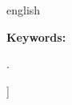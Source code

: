 \begin{@twocolumnfalse}
\begin{otherlanguage*}{english}
		{\fontsize{11}{13}\selectfont
		\AbstractArtigo
		\par}
		\vspace{0.7\baselineskip} \fontsize{11}{12}\selectfont
		\textbf{Keywords: }{\fontsize{11}{12}\selectfont 
		\KeywordsArtigo.
		\par}
		\PACSEnglish
	  \vspace{6mm}
\end{otherlanguage*}		
\end{@twocolumnfalse}
]
\pagestyle{plain}
